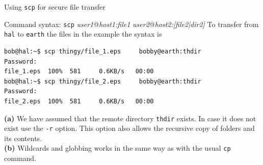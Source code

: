 \begin{frame}[t,fragile]{Using \alert{\texttt{scp}} for secure file transfer}


  \begin{block}{Command syntax: \alert{\texttt{scp} \emph{user1}@\emph{host1:file1}  \emph{user2}@\emph{host2:[file2|dir2]}}}
    {\footnotesize  To transfer from \texttt{hal} to \texttt{earth} the files in the example the syntax is}
{\scriptsize
  \begin{lstlisting}
bob@hal:~$ scp thingy/file_1.eps     bobby@earth:thdir
Password: 
file_1.eps  100%  581     0.6KB/s   00:00    
bob@hal:~$ scp thingy/file_2.eps     bobby@earth:thdir
Password: 
file_2.eps  100%  581     0.6KB/s   00:00    
  \end{lstlisting}
}

{\footnotesize\textbf{(a)}  We have assumed that the remote directory \texttt{thdir} exists. In case it does not exist use the \alert{\texttt{-r}} option. This option also allows the recursive copy of folders and its contents.\\
\textbf{(b)} Wildcards and globbing works in the same way as with the usual \texttt{cp} command.
}

  \end{block}
  
\end{frame}
